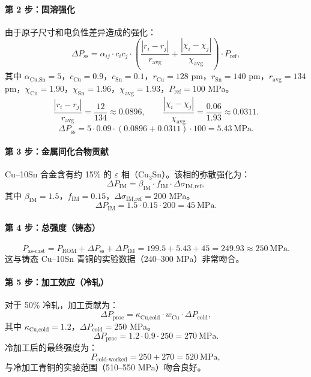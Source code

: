 \documentclass[12pt,a4paper]{article}
\begin{document}
	\paragraph{第 2 步：固溶强化}
	由于原子尺寸和电负性差异造成的强化：
	\[
	\Delta P_{\text{ss}} = \alpha_{ij} \cdot c_i c_j \cdot \left( \frac{|r_i - r_j|}{r_{\text{avg}}} + \frac{|\chi_i - \chi_j|}{\chi_{\text{avg}}} \right) \cdot P_{\text{ref}},
	\]
	其中 \(\alpha_{\text{Cu,Sn}} = 5\)，\(c_{\text{Cu}}=0.9\)，\(c_{\text{Sn}}=0.1\)，\(r_{\text{Cu}}=128\) pm，\(r_{\text{Sn}}=140\) pm，\(r_{\text{avg}}=134\) pm，\(\chi_{\text{Cu}}=1.90\)，\(\chi_{\text{Sn}}=1.96\)，\(\chi_{\text{avg}}=1.93\)，\(P_{\text{ref}} = 100\) MPa。
	\[
	\frac{|r_i - r_j|}{r_{\text{avg}}} = \frac{12}{134} \approx 0.0896, \qquad
	\frac{|\chi_i - \chi_j|}{\chi_{\text{avg}}} = \frac{0.06}{1.93} \approx 0.0311.
	\]
	\[
	\Delta P_{\text{ss}} = 5 \cdot 0.09 \cdot (0.0896 + 0.0311) \cdot 100 = 5.43\ \text{MPa}.
	\]
	
	\paragraph{第 3 步：金属间化合物贡献}
	Cu–10Sn 合金含有约 15\% 的 \(\varepsilon\) 相（Cu\(_3\)Sn）。该相的弥散强化为：
	\[
	\Delta P_{\text{IM}} = \beta_{\text{IM}} \cdot f_{\text{IM}} \cdot \Delta \sigma_{\text{IM,ref}},
	\]
	其中 \(\beta_{\text{IM}} = 1.5\)，\(f_{\text{IM}} = 0.15\)，\(\Delta \sigma_{\text{IM,ref}} = 200\) MPa。
	\[
	\Delta P_{\text{IM}} = 1.5 \cdot 0.15 \cdot 200 = 45\ \text{MPa}.
	\]
	
	\paragraph{第 4 步：总强度（铸态）}
	\[
	P_{\text{as-cast}} = P_{\text{ROM}} + \Delta P_{\text{ss}} + \Delta P_{\text{IM}} = 199.5 + 5.43 + 45 = 249.93 \approx 250\ \text{MPa}.
	\]
	这与铸态 Cu–10Sn 青铜的实验数据（240–300 MPa）非常吻合。
	
	\paragraph{第 5 步：加工效应（冷轧）}
	对于 50\% 冷轧，加工贡献为：
	\[
	\Delta P_{\text{proc}} = \kappa_{\text{Cu,cold}} \cdot w_{\text{Cu}} \cdot \Delta P_{\text{cold}},
	\]
	其中 \(\kappa_{\text{Cu,cold}} = 1.2\)，\(\Delta P_{\text{cold}} = 250\) MPa。
	\[
	\Delta P_{\text{proc}} = 1.2 \cdot 0.9 \cdot 250 = 270\ \text{MPa}.
	\]
	冷加工后的最终强度为：
	\[
	P_{\text{cold-worked}} = 250 + 270 = 520\ \text{MPa},
	\]
	与冷加工青铜的实验范围（510–550 MPa）吻合良好。
	
\end{document}
